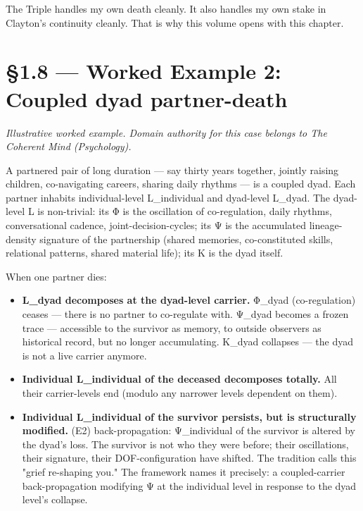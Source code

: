 \documentclass[11pt, openany]{book}
\newcommand{\sectionbreak}{\clearpage}
\begin{document}
The Triple handles my own death cleanly. It also handles my own stake in Clayton's continuity cleanly. That is why this volume opens with this chapter.

\sectionbreak

\section{§1.8 --- Worked Example 2: Coupled dyad partner-death}

\textit{Illustrative worked example. Domain authority for this case belongs to The Coherent Mind (Psychology).}

A partnered pair of long duration --- say thirty years together, jointly raising children, co-navigating careers, sharing daily rhythms --- is a coupled dyad. Each partner inhabits individual-level L\_\allowbreak{}individual and dyad-level L\_\allowbreak{}dyad. The dyad-level L is non-trivial: its Φ is the oscillation of co-regulation, daily rhythms, conversational cadence, joint-decision-cycles; its Ψ is the accumulated lineage-density signature of the partnership (shared memories, co-constituted skills, relational patterns, shared material life); its Κ is the dyad itself.

When one partner dies:

\begin{itemize}
\item \textbf{L\_\allowbreak{}dyad decomposes at the dyad-level carrier.} Φ\_\allowbreak{}dyad (co-regulation) ceases --- there is no partner to co-regulate with. Ψ\_\allowbreak{}dyad becomes a frozen trace --- accessible to the survivor as memory, to outside observers as historical record, but no longer accumulating. Κ\_\allowbreak{}dyad collapses --- the dyad is not a live carrier anymore.
\item \textbf{Individual L\_\allowbreak{}individual of the deceased decomposes totally.} All their carrier-levels end (modulo any narrower levels dependent on them).
\item \textbf{Individual L\_\allowbreak{}individual of the survivor persists, but is structurally modified.} (E2) back-propagation: Ψ\_\allowbreak{}individual of the survivor is altered by the dyad's loss. The survivor is not who they were before; their oscillations, their signature, their DOF-configuration have shifted. The tradition calls this "grief re-shaping you." The framework names it precisely: a coupled-carrier back-propagation modifying Ψ at the individual level in response to the dyad level's collapse.
\end{itemize}
\end{document}
